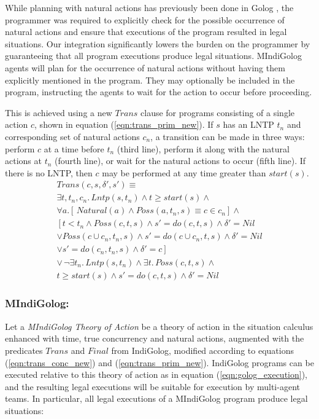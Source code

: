 \documentclass[letterpaper]{article}
\begin{document}
While planning with natural actions has previously been done in Golog
\cite{pirri00planning_nat_acts}, the programmer
was required to explicitly check for the possible occurrence of natural
actions and ensure that executions of the program resulted in legal
situations. Our integration significantly lowers the burden on the
programmer by guaranteeing that all program executions produce legal
situations.
MIndiGolog agents will plan for the occurrence of natural actions
without having them explicitly mentioned in the program.  They may
optionally be included in the program, instructing the agents to wait for
the action to occur before proceeding.

This is achieved using a new $Trans$ clause for programs consisting of a single
action $c$, shown in equation (\ref{eqn:trans_prim_new}).
If $s$ has an LNTP $t_n$ and corresponding
set of natural actions $c_n$, a transition can be made in three ways:
perform $c$ at a time before $t_n$ (third line), perform it along with
the natural actions at $t_n$ (fourth line), or wait for the natural
actions to occur (fifth line).  If there is no LNTP, then $c$ may be
performed at any time greater than $start(s)$.
\begin{multline}
\label{eqn:trans_prim_new}
Trans(c,s,\delta',s')\equiv \\
  \exists t,t_n,c_n.\,Lntp(s,t_n) \wedge t\geq start(s) \wedge\\
      \forall a.\left[\,Natural(a)\wedge Poss(a,t_n,s)\equiv c\in c_n\right]\wedge\\
      \left[ t<t_n\wedge Poss(c,t,s)\wedge s'=do(c,t,s)\wedge \delta'=Nil\right.\\
            \vee Poss(c\cup c_n,t_n,s)\wedge s'=do(c\cup c_n,t,s)\wedge \delta'=Nil\\
            \vee \left.s'=do(c_n,t_n,s)\wedge \delta'=c\right]\\
  \vee\,\neg\exists t_{n}.\,Lntp(s,t_{n})\wedge\exists t.\,Poss(c,t,s)\wedge\\
  t\geq start(s)\wedge s'=do(c,t,s)\wedge\delta'=Nil
\end{multline}

\subsubsection{MIndiGolog:}
Let a \emph{MIndiGolog Theory of Action} be a theory
of action in the situation calculus enhanced with time, true concurrency and
natural actions, augmented with the predicates $Trans$ and $Final$ from
IndiGolog, modified according to equations (\ref{eqn:trans_conc_new}) and
(\ref{eqn:trans_prim_new}).
IndiGolog programs can be executed relative to this
theory of action as in equation (\ref{eqn:golog_execution}),
and the resulting legal
executions will be suitable for execution by multi-agent teams.
In particular, all legal executions of a MIndiGolog
program produce legal situations:
\end{document}
